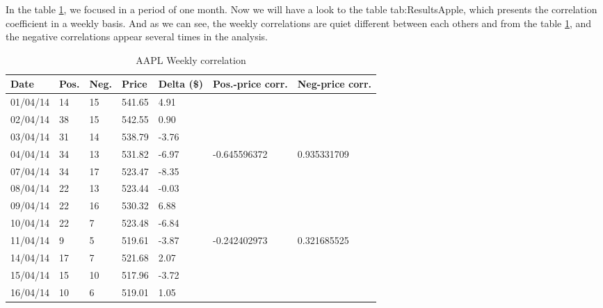 In the table \ref{tab:ResultsApple}, we focused in a period of one month. Now we will have a look to the table {tab:ResultsApple}, which presents the correlation coefficient in a weekly basis. And as we can see, the weekly correlations are quiet different between each others and from the table \ref{tab:ResultsApple}, and the negative correlations appear several times in the analysis.

\begin{table}\centering
	\caption{AAPL Weekly correlation}\label{tab:ResultsApple}
   	\begin{tabular}{ | p{1.8cm\textwidth} | p{1cm\textwidth} | p{1cm\textwidth} | p{1.1cm\textwidth} | p{1.1cm\textwidth} | p{2.5cm\textwidth} | p{2.5cm\textwidth} |}
   	\hline

\textbf{Date}           & \textbf{Pos.} & \textbf{Neg.} & \textbf{Price}  & \textbf{Delta (\$)} & \textbf{Pos.-price corr.} & \textbf{Neg-price corr.} \\\hline
01/04/14 & 14   & 15   & 541.65 & 4.91         &                    &                     \\\hline
02/04/14 & 38   & 15   & 542.55 & 0.90         &                    &                     \\\hline
03/04/14 & 31   & 14   & 538.79 & -3.76        &                    &                     \\\hline
04/04/14 & 34   & 13   & 531.82 & -6.97        & -0.645596372       & 0.935331709         \\\hline
07/04/14 & 34   & 17   & 523.47 & -8.35        &                    &                     \\\hline
08/04/14 & 22   & 13   & 523.44 & -0.03        &                    &                     \\\hline
09/04/14 & 22   & 16   & 530.32 & 6.88         &                    &                     \\\hline
10/04/14 & 22   & 7    & 523.48 & -6.84        &                    &                     \\\hline
11/04/14 & 9    & 5    & 519.61 & -3.87        & -0.242402973       & 0.321685525         \\\hline
14/04/14 & 17   & 7    & 521.68 & 2.07         &                    &                     \\\hline
15/04/14 & 15   & 10   & 517.96 & -3.72        &                    &                     \\\hline
16/04/14 & 10   & 6    & 519.01 & 1.05         &                    &                     \\\hline

\end{tabular}
\end{table}
